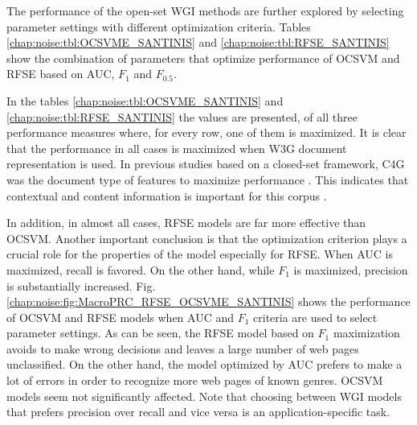 The performance of the open-set WGI methods are further explored by selecting parameter settings with different optimization criteria. Tables \ref{chap:noise:tbl:OCSVME_SANTINIS} and \ref{chap:noise:tbl:RFSE_SANTINIS} show the combination of parameters that optimize performance of OCSVM and RFSE based on AUC, $F_{1}$ and $F_{0.5}$. 

In the tables \ref{chap:noise:tbl:OCSVME_SANTINIS} and \ref{chap:noise:tbl:RFSE_SANTINIS} the values are presented, of all three performance measures where, for every row, one of them is maximized. It is clear that the performance in all cases is maximized when W3G document representation is used. In previous studies based on a closed-set framework, C4G was the document type of features to maximize performance \parencite{Sharroff2010}. This indicates that contextual and content information is important for this corpus \parencite{Asheghi2015}.

In addition, in almost all cases, RFSE models are far more effective than OCSVM. Another important conclusion is that the optimization criterion plays a crucial role for the properties of the model especially for RFSE. When AUC is maximized, recall is favored. On the other hand, while $F_{1}$ is maximized, precision is substantially increased. Fig. \ref{chap:noise:fig:MacroPRC_RFSE_OCSVME_SANTINIS} shows the performance of OCSVM and RFSE models when AUC and $F_{1}$ criteria are used to select parameter settings. As can be seen, the RFSE model based on $F_{1}$ maximization avoids to make wrong decisions and leaves a large number of web pages unclassified. On the other hand, the model optimized by AUC prefers to make a lot of errors in order to recognize more web pages of known genres. OCSVM models seem not significantly affected. Note that choosing between WGI models that prefers precision over recall and vice versa is an application-specific task.



